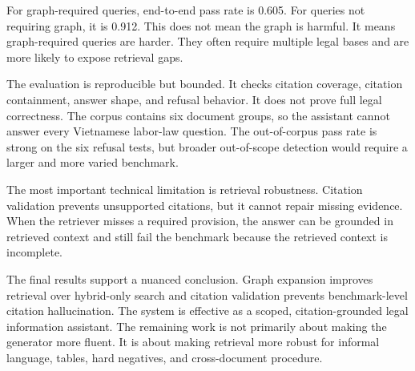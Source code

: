 For graph-required queries, end-to-end pass rate is 0.605. For queries not requiring graph, it is 0.912. This does not mean the graph is harmful. It means graph-required queries are harder. They often require multiple legal bases and are more likely to expose retrieval gaps.

The evaluation is reproducible but bounded. It checks citation coverage, citation containment, answer shape, and refusal behavior. It does not prove full legal correctness. The corpus contains six document groups, so the assistant cannot answer every Vietnamese labor-law question. The out-of-corpus pass rate is strong on the six refusal tests, but broader out-of-scope detection would require a larger and more varied benchmark.

The most important technical limitation is retrieval robustness. Citation validation prevents unsupported citations, but it cannot repair missing evidence. When the retriever misses a required provision, the answer can be grounded in retrieved context and still fail the benchmark because the retrieved context is incomplete.

The final results support a nuanced conclusion. Graph expansion improves retrieval over hybrid-only search and citation validation prevents benchmark-level citation hallucination. The system is effective as a scoped, citation-grounded legal information assistant. The remaining work is not primarily about making the generator more fluent. It is about making retrieval more robust for informal language, tables, hard negatives, and cross-document procedure.
